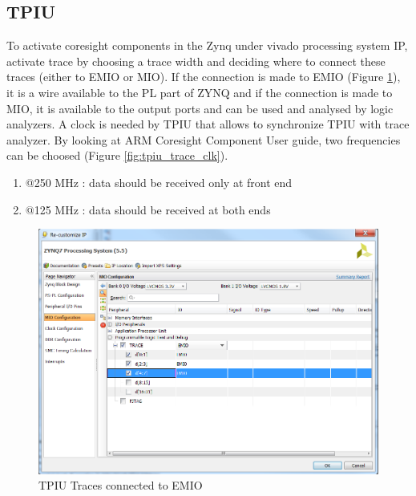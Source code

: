 \documentclass[10pt,a4paper, oneside]{memoir}
\begin{document}
\subsection{TPIU}
To activate coresight components in the Zynq under vivado processing system IP, activate trace by choosing a trace width and deciding where to connect these traces (either to EMIO or MIO). If the connection is made to EMIO (Figure \ref{fig:tpiu_trace}), it is a wire available to the PL part of ZYNQ and if the connection is made to MIO, it is available to the output ports and can be used and analysed by logic analyzers. A clock is needed by TPIU that allows to synchronize TPIU with trace analyzer. By looking at ARM Coresight Component User guide, two frequencies can be choosed (Figure \ref{fig:tpiu_trace_clk}). 

\begin{enumerate}
\item @250 MHz : data should be received only at front end
\item @125 MHz : data should be received at both ends
\end{enumerate}

\begin{figure}
\centering
\includegraphics[scale=.6, keepaspectratio]{images/zynq_trace_tpiu}
\caption{TPIU Traces connected to EMIO}
\label{fig:tpiu_trace}
\end{figure}
\end{document}
